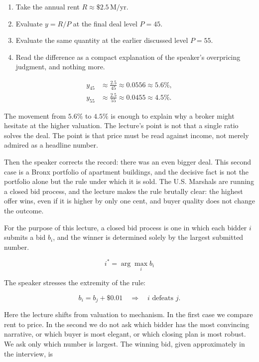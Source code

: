 \begin{enumerate}
\item Take the annual rent \(R \approx \$2.5\,\text{M/yr}\).
\item Evaluate \(y = R/P\) at the final deal level \(P=45\).
\item Evaluate the same quantity at the earlier discussed level \(P=55\).
\item Read the difference as a compact explanation of the speaker's overpricing judgment, and nothing more.
\end{enumerate}

\begin{align}
y_{45} &\approx \frac{2.5}{45} \approx 0.0556 \approx 5.6\%, \\
y_{55} &\approx \frac{2.5}{55} \approx 0.0455 \approx 4.5\%.
\end{align}

The movement from \(5.6\%\) to \(4.5\%\) is enough to explain why a broker might hesitate at the higher valuation. The lecture's point is not that a single ratio solves the deal. The point is that price must be read against income, not merely admired as a headline number.

Then the speaker corrects the record: there was an even bigger deal. This second case is a Bronx portfolio of apartment buildings, and the decisive fact is not the portfolio alone but the rule under which it is sold. The U.S. Marshals are running a closed bid process, and the lecture makes the rule brutally clear: the highest offer wins, even if it is higher by only one cent, and buyer quality does not change the outcome.

\begin{definition}
For the purpose of this lecture, a closed bid process is one in which each bidder \(i\) submits a bid \(b_i\), and the winner is determined solely by the largest submitted number.
\end{definition}

\begin{equation}
i^{\ast} = \arg\max_i b_i
\end{equation}

The speaker stresses the extremity of the rule:

\begin{equation}
b_i = b_j + \$0.01 \quad \Longrightarrow \quad i \text{ defeats } j.
\end{equation}

Here the lecture shifts from valuation to mechanism. In the first case we compare rent to price. In the second we do not ask which bidder has the most convincing narrative, or which buyer is most elegant, or which closing plan is most robust. We ask only which number is largest. The winning bid, given approximately in the interview, is

